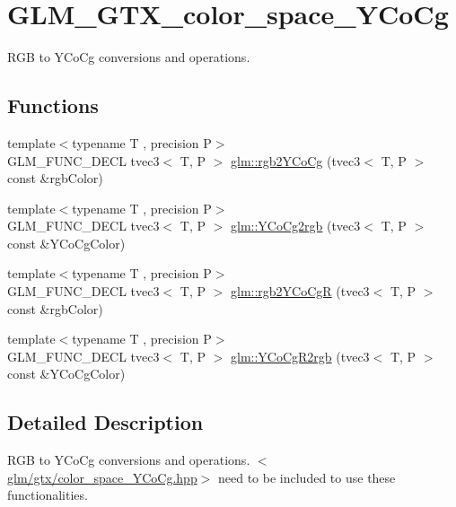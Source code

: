 \hypertarget{group__gtx__color__space__YCoCg}{\section{G\-L\-M\-\_\-\-G\-T\-X\-\_\-color\-\_\-space\-\_\-\-Y\-Co\-Cg}
\label{group__gtx__color__space__YCoCg}
}


R\-G\-B to Y\-Co\-Cg conversions and operations.  


\subsection*{Functions}
\begin{DoxyCompactItemize}
\item 
{\footnotesize template$<$typename T , precision P$>$ }\\G\-L\-M\-\_\-\-F\-U\-N\-C\-\_\-\-D\-E\-C\-L tvec3$<$ T, P $>$ \hyperlink{group__gtx__color__space__YCoCg_ga19481f6947c5b5482debd41e71b8c941}{glm\-::rgb2\-Y\-Co\-Cg} (tvec3$<$ T, P $>$ const \&rgb\-Color)
\item 
{\footnotesize template$<$typename T , precision P$>$ }\\G\-L\-M\-\_\-\-F\-U\-N\-C\-\_\-\-D\-E\-C\-L tvec3$<$ T, P $>$ \hyperlink{group__gtx__color__space__YCoCg_ga6d7e988a79b299ca1fa59f537e13800b}{glm\-::\-Y\-Co\-Cg2rgb} (tvec3$<$ T, P $>$ const \&Y\-Co\-Cg\-Color)
\item 
{\footnotesize template$<$typename T , precision P$>$ }\\G\-L\-M\-\_\-\-F\-U\-N\-C\-\_\-\-D\-E\-C\-L tvec3$<$ T, P $>$ \hyperlink{group__gtx__color__space__YCoCg_ga2e534594cc8ad252d23b14fb363ae9e2}{glm\-::rgb2\-Y\-Co\-Cg\-R} (tvec3$<$ T, P $>$ const \&rgb\-Color)
\item 
{\footnotesize template$<$typename T , precision P$>$ }\\G\-L\-M\-\_\-\-F\-U\-N\-C\-\_\-\-D\-E\-C\-L tvec3$<$ T, P $>$ \hyperlink{group__gtx__color__space__YCoCg_ga4bac5462c00df0ae89242ecdbbe5dbad}{glm\-::\-Y\-Co\-Cg\-R2rgb} (tvec3$<$ T, P $>$ const \&Y\-Co\-Cg\-Color)
\end{DoxyCompactItemize}


\subsection{Detailed Description}
R\-G\-B to Y\-Co\-Cg conversions and operations. $<$\hyperlink{color__space__YCoCg_8hpp}{glm/gtx/color\-\_\-space\-\_\-\-Y\-Co\-Cg.\-hpp}$>$ need to be included to use these functionalities. 

